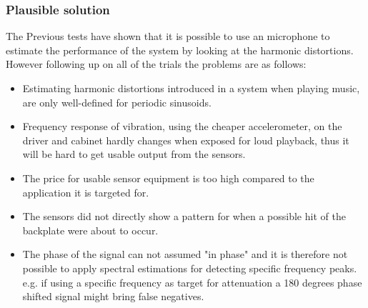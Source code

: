 


%



%

%



\subsubsection{Plausible solution} 
The Previous tests have shown that it is possible to use an microphone to estimate the performance of the system by looking at the harmonic distortions. However following up on all of the trials the problems are as follows:
\begin{itemize}
\item Estimating harmonic distortions introduced in a system when playing music, are only well-defined for periodic sinusoids.
\item Frequency response of vibration, using the cheaper accelerometer, on the driver and cabinet hardly changes when exposed for loud playback, thus it will be hard to get usable output from the sensors.
\item The price for usable sensor equipment is too high compared to the application it is targeted for. 
\item The sensors did not directly show a pattern for when a possible hit of the backplate were about to occur.
\item The phase of the signal can not assumed "in phase" and it is therefore not possible to apply spectral estimations for detecting specific frequency peaks. e.g. if using a specific frequency as target for attenuation a 180 degrees phase shifted signal might bring false negatives. 
\end{itemize}

